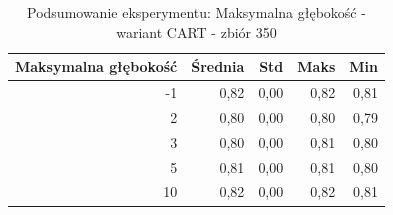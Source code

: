 \begin{table}[htbp]
\centering
\small
\setlength{\tabcolsep}{6pt}
\renewcommand{\arraystretch}{1.2}
\caption{Podsumowanie eksperymentu: Maksymalna głębokość - wariant CART - zbiór 350}
\label{tab:CART_max_depth_350}
\begin{tabular}{r|r|r|r|r}
\toprule
Maksymalna głębokość & Średnia & Std & Maks & Min \\
\hline
-1 & 0,82 & 0,00 & 0,82 & 0,81 \\
2 & 0,80 & 0,00 & 0,80 & 0,79 \\
3 & 0,80 & 0,00 & 0,81 & 0,80 \\
5 & 0,81 & 0,00 & 0,81 & 0,80 \\
10 & 0,82 & 0,00 & 0,82 & 0,81 \\
\bottomrule
\end{tabular}
\end{table}
